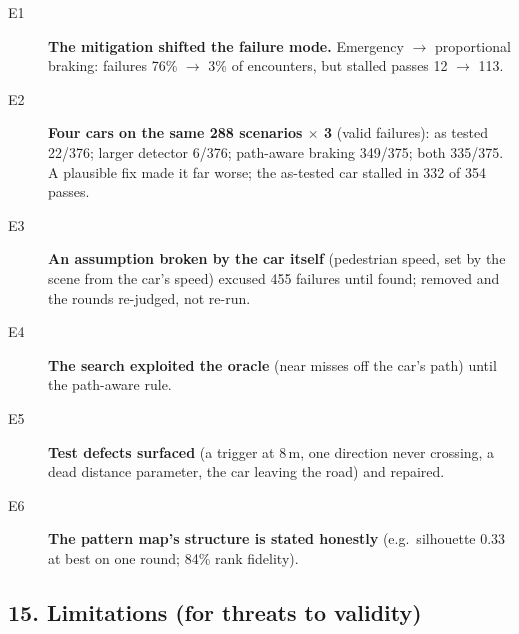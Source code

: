 \begin{description}
\item[E1] \textbf{The mitigation shifted the failure mode.} Emergency $\rightarrow$ proportional braking: failures 76\% $\rightarrow$ 3\% of encounters, but stalled passes 12 $\rightarrow$ 113.
\item[E2] \textbf{Four cars on the same 288 scenarios $\times$ 3} (valid failures): as tested 22/376; larger detector 6/376; path-aware braking 349/375; both 335/375. A plausible fix made it far worse; the as-tested car stalled in 332 of 354 passes.
\item[E3] \textbf{An assumption broken by the car itself} (pedestrian speed, set by the scene from the car's speed) excused 455 failures until found; removed and the rounds re-judged, not re-run.
\item[E4] \textbf{The search exploited the oracle} (near misses off the car's path) until the path-aware rule.
\item[E5] \textbf{Test defects surfaced} (a trigger at 8\,m, one direction never crossing, a dead distance parameter, the car leaving the road) and repaired.
\item[E6] \textbf{The pattern map's structure is stated honestly} (e.g.\ silhouette 0.33 at best on one round; 84\% rank fidelity).
\end{description}

\subsection*{15. Limitations (for threats to validity)}


